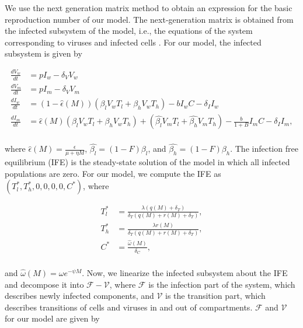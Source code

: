 \documentclass[11pt, oneside]{article}    %
\begin{document}
\vspace{5mm}

	 We use the next generation matrix method \cite{Diekmann} to obtain an expression for the basic reproduction number of our model. The next-generation matrix is obtained from the infected subsystem of the model, i.e., the equations of the system corresponding to viruses and infected cells \cite{Diekmann}. For our model, the infected subsystem is given by


\begin{align*}
\frac{d V_w}{dt} & =  p I_w - \delta_V V_w\\
\frac{d V_m}{dt} & =  p I_m - \delta_V V_m\\
\frac{d I_w}{dt} & =  (1-\hat{\epsilon}(M))(\beta_l V_w T_l + \beta_h V_w T_h) - b I_w C - \delta_I I_w\\
\frac{d I_m}{dt} & =  \hat{\epsilon}(M)(\beta_l V_w T_l + \beta_h V_w T_h) +  (\hat{\beta_l} V_m T_l +\hat{\beta_h} V_m T_h)  -\frac{b}{1+B} I_m C -\delta_I I_m,\\
\end{align*}


where $\hat{\epsilon}(M) =  \frac{\epsilon}{\mu + \eta M}$, $\hat{\beta_l} = (1-F) \beta_l$, and $\hat{\beta_h} = (1-F) \beta_h$. The infection free equilibrium (IFE) is the steady-state solution of the model in which all infected populations are zero. For our model, we compute the IFE as $(T_l^*,T_h^*,0,0,0,0,C^*)$, where

\begin{align*}
T_l^* & =  \frac{\lambda (q(M) + \delta_T)}{\delta_T (q(M) + r(M) +\delta_T)},\\
T_h^* & =  \frac{\lambda r(M)}{\delta_T (q(M) + r(M) +\delta_T)},\\
C^* & = 	 \frac{\hat{\omega}(M)}{\delta_C},\\
\end{align*}

\hspace{-7mm} and $\hat{\omega}(M) = \omega e^{-\psi M}$. Now, we linearize the infected subsystem about the IFE and decompose it into $\mathcal F - \mathcal V$, where $\mathcal F$ is the infection part of the system, which describes newly infected components, and $\mathcal V$ is the transition part, which describes transitions of cells and viruses in and out of compartments.  $\mathcal F$ and $\mathcal V$  for our model are given by
\end{document}

